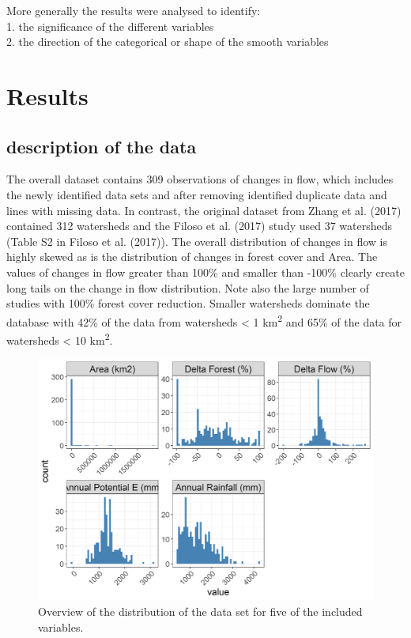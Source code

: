 \documentclass[]{elsarticle} %
\begin{document}
More generally the results were analysed to identify:\\
1. the significance of the different variables\\
2. the direction of the categorical or shape of the smooth variables

\hypertarget{results}{%
\section{Results}\label{results}}

\hypertarget{description-of-the-data}{%
\subsection{description of the data}\label{description-of-the-data}}

The overall dataset contains 309 observations of changes in flow, which includes the newly identified data sets and after removing identified duplicate data and lines with missing data. In contrast, the original dataset from Zhang et al. (2017) contained 312 watersheds and the Filoso et al. (2017) study used 37 watersheds (Table S2 in Filoso et al. (2017)). The overall distribution of changes in flow is highly skewed as is the distribution of changes in forest cover and Area. The values of changes in flow greater than 100\% and smaller than -100\% clearly create long tails on the change in flow distribution. Note also the large number of studies with 100\% forest cover reduction. Smaller watersheds dominate the database with 42\% of the data from watersheds \textless{} 1 km\textsuperscript{2} and 65\% of the data for watersheds \textless{} 10 km\textsuperscript{2}.



\begin{figure}
\includegraphics[width=0.9\linewidth]{./DataExploration} \caption{Overview of the distribution of the data set for five of the included variables.}\label{fig:datagraphs}
\end{figure}
\end{document}
